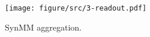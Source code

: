 \begin{figure}[!htb]
  \centering
  \texttt{[image: figure/src/3-readout.pdf]}
  \caption{SynMM aggregation.}
  \label{fig:readout}
\end{figure}